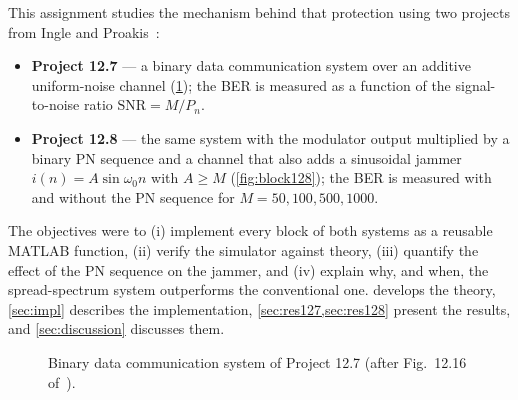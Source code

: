 \documentclass[11pt,a4paper]{article}
\newcommand{\snr}{\mathrm{SNR}}
\begin{document}
This assignment studies the mechanism behind that protection using two projects
from Ingle and Proakis~\cite{ingle2017}:
\begin{itemize}
  \item \textbf{Project 12.7} --- a binary data communication system over an additive
        uniform-noise channel (\cref{fig:block127}); the BER is measured as a function
        of the signal-to-noise ratio $\snr = M/P_n$.
  \item \textbf{Project 12.8} --- the same system with the modulator output multiplied
        by a binary PN sequence and a channel that also adds a sinusoidal jammer
        $i(n)=A\sin\omega_0 n$ with $A\ge M$ (\cref{fig:block128}); the BER is
        measured with and without the PN sequence for $M = 50, 100, 500, 1000$.
\end{itemize}

The objectives were to (i) implement every block of both systems as a reusable
MATLAB function, (ii) verify the simulator against theory, (iii) quantify the
effect of the PN sequence on the jammer, and (iv) explain why, and when, the
spread-spectrum system outperforms the conventional one. 
develops the theory, \cref{sec:impl} describes the implementation,
\cref{sec:res127,sec:res128} present the results, and \cref{sec:discussion}
discusses them.

\begin{figure}[t]
\centering
{}
\caption{Binary data communication system of Project 12.7 (after Fig.~12.16 of~\cite{ingle2017}).}
\label{fig:block127}
\end{figure}
\end{document}
